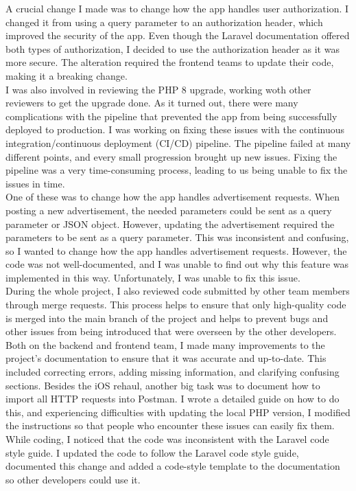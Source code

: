 \documentclass[sf-font,usefira,english]{uulm/sp/article}
\begin{document}
A crucial change I made was to change how the app handles user authorization.
I changed it from using a query parameter to an authorization header, which improved the security of the app. 
Even though the Laravel documentation offered both types of authorization, I decided to use the authorization header as it was more secure. 
The alteration required the frontend teams to update their code, making it a breaking change.\\

I was also involved in reviewing the PHP 8 upgrade, working woth other reviewers to get the upgrade done.
As it turned out, there were many complications with the pipeline that prevented the app from being successfully deployed to production. 
I was working on fixing these issues with the continuous integration/continuous deployment (CI/CD) pipeline. 
The pipeline failed at many different points, and every small progression brought up new issues. 
Fixing the pipeline was a very time-consuming process, leading to us being unable to fix the issues in time.\\
 
One of these was to change how the app handles advertisement requests. 
When posting a new advertisement, the needed parameters could be sent as a query parameter or JSON object. 
However, updating the advertisement required the parameters to be sent as a query parameter. 
This was inconsistent and confusing, so I wanted to change how the app handles advertisement requests. 
However, the code was not well-documented, and I was unable to find out why this feature was implemented in this way. 
Unfortunately, I was unable to fix this issue.\\

During the whole project, I also reviewed code submitted by other team members through merge requests. 
This process helps to ensure that only high-quality code is merged into the main branch of the project and helps to prevent bugs and other issues from being introduced that were overseen by the other developers.\\

Both on the backend and frontend team, I made many improvements to the project’s documentation to ensure that it was accurate and up-to-date. 
This included correcting errors, adding missing information, and clarifying confusing sections. 
Besides the iOS rehaul, another big task was to document how to import all HTTP requests into Postman.
I wrote a detailed guide on how to do this, and experiencing difficulties with updating the local PHP version, I modified the instructions so that people who encounter these issues can easily fix them.\\
While coding, I noticed that the code was inconsistent with the Laravel code style guide. 
I updated the code to follow the Laravel code style guide, documented this change and added a code-style template to the documentation so other developers could use it.\\
\end{document}
